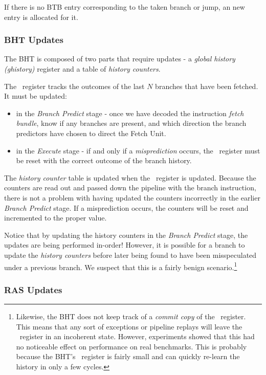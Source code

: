 If there is no BTB entry corresponding to the taken branch or jump, an new entry is allocated for it.

\subsubsection{BHT Updates}

The BHT is composed of two parts that require updates - a {\em global history (ghistory)} register and a table of {\em history counters}. 

The \ghistory\ register tracks the outcomes of the last $N$ branches that have been fetched. It must be updated:

\begin{itemize}
\item in the {\em Branch Predict} stage - once we have decoded the instruction {\em fetch bundle}, know if any branches are present, and which direction the branch predictors have chosen to direct the Fetch Unit.
\item in the {\em Execute} stage - if and only if a {\em misprediction} occurs, the \ghistory\ register must be reset with the correct outcome of the branch history.
\end{itemize}

The {\em history counter} table is updated when the \ghistory\ register is updated.  Because the counters are read out and passed down the pipeline with the branch instruction, there is not a problem with having updated the counters incorrectly in the earlier {\em Branch Predict} stage. If a misprediction occurs, the counters will be reset and incremented to the proper value.

Notice that by updating the history counters in the {\em Branch Predict} stage, the updates are being performed in-order!  However, it is possible for a branch to update the {\em history counters} before later being found to have been misspeculated under a previous branch. We suspect that this is a fairly benign scenario.\footnote{Likewise, the BHT does not keep track of a {\em commit copy} of the \ghistory\ register.  This means that any sort of exceptions or pipeline replays will leave the \ghistory\ register in an incoherent state.  However, experiments showed that this had no noticeable effect on performance on real benchmarks.  This is probably because the BHT's \ghistory\ register is fairly small and can quickly re-learn the history in only a few cycles.}


\subsubsection{RAS Updates}

